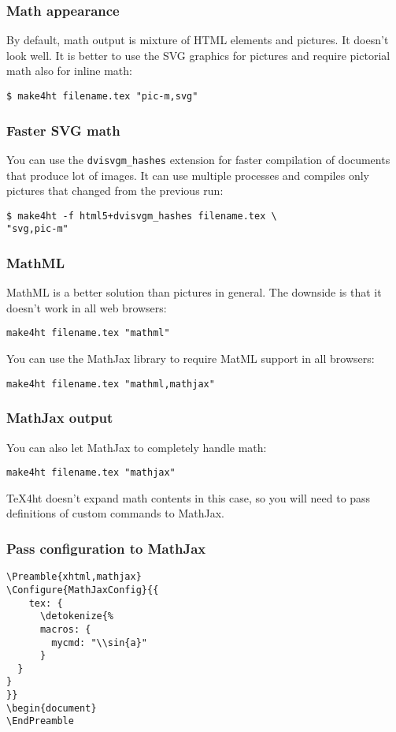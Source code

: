 \documentclass{beamer}
\begin{document}
\begin{frame}[fragile]
  \frametitle{Math appearance}
  By default, math output is mixture of HTML elements and pictures. It doesn't look well.
  It is better to use the SVG graphics for pictures and require pictorial math also for inline math:
\begin{verbatim}
$ make4ht filename.tex "pic-m,svg"
\end{verbatim}
\end{frame}

\begin{frame}[fragile]
  \frametitle{Faster SVG math}
You can use the \verb|dvisvgm_hashes| extension for faster compilation of documents that produce
lot of images. It can use multiple processes and compiles only pictures that changed from the 
previous run:

\begin{verbatim}
$ make4ht -f html5+dvisvgm_hashes filename.tex \ 
"svg,pic-m"
\end{verbatim}
\end{frame}

\begin{frame}[fragile]
  \frametitle{MathML}
  MathML is a better solution than pictures in general. The downside is that it doesn't work in all web browsers:
\begin{verbatim}
make4ht filename.tex "mathml"
\end{verbatim}

You can use the MathJax library to require MatML support in all browsers:

\begin{verbatim}
make4ht filename.tex "mathml,mathjax"
\end{verbatim}
\end{frame}


\begin{frame}[fragile]
\frametitle{MathJax output}
You can also let MathJax to completely handle math:

\begin{verbatim}
make4ht filename.tex "mathjax"
\end{verbatim}

\TeX4ht doesn't expand math contents in this case, so you will need to pass definitions of custom commands to MathJax.
\end{frame}

\begin{frame}[fragile]
  \frametitle{Pass configuration to MathJax}

\begin{verbatim}
\Preamble{xhtml,mathjax}
\Configure{MathJaxConfig}{{
    tex: {
      \detokenize{%
      macros: {
        mycmd: "\\sin{a}"
      }
  }
}
}}
\begin{document}
\EndPreamble
\end{verbatim}
\end{frame}
\end{document}
